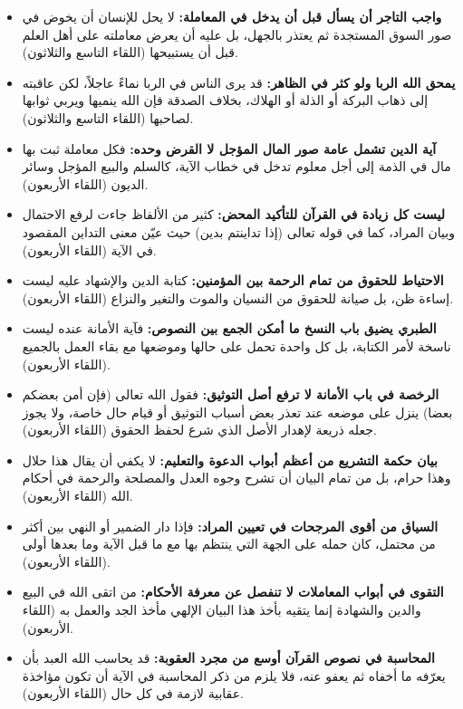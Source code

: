 \begin{itemize}
    \item \textbf{واجب التاجر أن يسأل قبل أن يدخل في المعاملة:} لا يحل للإنسان أن يخوض في صور السوق المستجدة ثم يعتذر بالجهل، بل عليه أن يعرض معاملته على أهل العلم قبل أن يستبيحها (اللقاء التاسع والثلاثون).
    \item \textbf{يمحق الله الربا ولو كثر في الظاهر:} قد يرى الناس في الربا نماءً عاجلاً، لكن عاقبته إلى ذهاب البركة أو الذلة أو الهلاك، بخلاف الصدقة فإن الله ينميها ويربي ثوابها لصاحبها (اللقاء التاسع والثلاثون).
    \item \textbf{آية الدين تشمل عامة صور المال المؤجل لا القرض وحده:} فكل معاملة ثبت بها مال في الذمة إلى أجل معلوم تدخل في خطاب الآية، كالسلم والبيع المؤجل وسائر الديون (اللقاء الأربعون).
    \item \textbf{ليست كل زيادة في القرآن للتأكيد المحض:} كثير من الألفاظ جاءت لرفع الاحتمال وبيان المراد، كما في قوله تعالى (إذا تداينتم بدين) حيث عيّن معنى التداين المقصود في الآية (اللقاء الأربعون).
    \item \textbf{الاحتياط للحقوق من تمام الرحمة بين المؤمنين:} كتابة الدين والإشهاد عليه ليست إساءة ظن، بل صيانة للحقوق من النسيان والموت والتغير والنزاع (اللقاء الأربعون).
    \item \textbf{الطبري يضيق باب النسخ ما أمكن الجمع بين النصوص:} فآية الأمانة عنده ليست ناسخة لأمر الكتابة، بل كل واحدة تحمل على حالها وموضعها مع بقاء العمل بالجميع (اللقاء الأربعون).
    \item \textbf{الرخصة في باب الأمانة لا ترفع أصل التوثيق:} فقول الله تعالى (فإن أمن بعضكم بعضا) ينزل على موضعه عند تعذر بعض أسباب التوثيق أو قيام حال خاصة، ولا يجوز جعله ذريعة لإهدار الأصل الذي شرع لحفظ الحقوق (اللقاء الأربعون).
    \item \textbf{بيان حكمة التشريع من أعظم أبواب الدعوة والتعليم:} لا يكفي أن يقال هذا حلال وهذا حرام، بل من تمام البيان أن تشرح وجوه العدل والمصلحة والرحمة في أحكام الله (اللقاء الأربعون).
    \item \textbf{السياق من أقوى المرجحات في تعيين المراد:} فإذا دار الضمير أو النهي بين أكثر من محتمل، كان حمله على الجهة التي ينتظم بها مع ما قبل الآية وما بعدها أولى (اللقاء الأربعون).
    \item \textbf{التقوى في أبواب المعاملات لا تنفصل عن معرفة الأحكام:} من اتقى الله في البيع والدين والشهادة إنما يتقيه بأخذ هذا البيان الإلهي مأخذ الجد والعمل به (اللقاء الأربعون).
    \item \textbf{المحاسبة في نصوص القرآن أوسع من مجرد العقوبة:} قد يحاسب الله العبد بأن يعرّفه ما أخفاه ثم يعفو عنه، فلا يلزم من ذكر المحاسبة في الآية أن تكون مؤاخذة عقابية لازمة في كل حال (اللقاء الأربعون).
\end{itemize}

